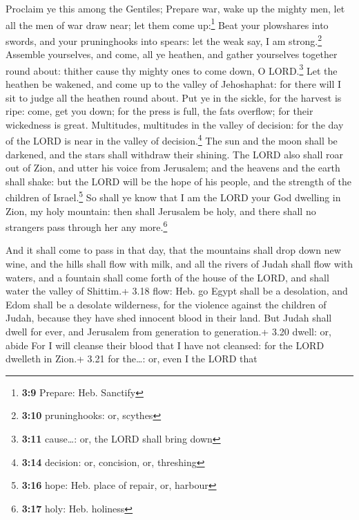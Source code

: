  Proclaim ye this among the Gentiles; Prepare war, wake up
the mighty men, let all the men of war draw near; let them come
up:\footnote{\textbf{3:9} Prepare: Heb. Sanctify}  Beat
your plowshares into swords, and your pruninghooks into spears: let the
weak say, I am strong.\footnote{\textbf{3:10} pruninghooks: or, scythes}
 Assemble yourselves, and come, all ye heathen, and
gather yourselves together round about: thither cause thy mighty ones to
come down, O LORD.\footnote{\textbf{3:11} cause\ldots: or, the LORD
  shall bring down}  Let the heathen be wakened, and come
up to the valley of Jehoshaphat: for there will I sit to judge all the
heathen round about.  Put ye in the sickle, for the
harvest is ripe: come, get you down; for the press is full, the fats
overflow; for their wickedness is great.  Multitudes,
multitudes in the valley of decision: for the day of the LORD is near in
the valley of decision.\footnote{\textbf{3:14} decision: or, concision,
  or, threshing}  The sun and the moon shall be darkened,
and the stars shall withdraw their shining.  The LORD
also shall roar out of Zion, and utter his voice from Jerusalem; and the
heavens and the earth shall shake: but the LORD will be the hope of his
people, and the strength of the children of Israel.\footnote{\textbf{3:16}
  hope: Heb. place of repair, or, harbour}  So shall ye
know that I am the LORD your God dwelling in Zion, my holy mountain:
then shall Jerusalem be holy, and there shall no strangers pass through
her any more.\footnote{\textbf{3:17} holy: Heb. holiness}

 And it shall come to pass in that day, that the
mountains shall drop down new wine, and the hills shall flow with milk,
and all the rivers of Judah shall flow with waters, and a fountain shall
come forth of the house of the LORD, and shall water the valley of
Shittim.+ 3.18 flow: Heb. go  Egypt shall be a
desolation, and Edom shall be a desolate wilderness, for the violence
against the children of Judah, because they have shed innocent blood in
their land.  But Judah shall dwell for ever, and
Jerusalem from generation to generation.+ 3.20 dwell: or, abide
 For I will cleanse their blood that I have not cleansed:
for the LORD dwelleth in Zion.+ 3.21 for the\ldots: or, even I the LORD
that
